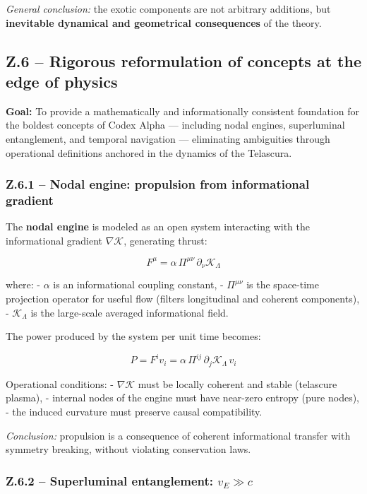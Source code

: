 \documentclass[12pt]{article}
\begin{document}
\textit{General conclusion:} the exotic components are not arbitrary additions, but \textbf{inevitable dynamical and geometrical consequences} of the theory.

\subsection*{Z.6 – Rigorous reformulation of concepts at the edge of physics}

\textbf{Goal:} To provide a mathematically and informationally consistent foundation for the boldest concepts of Codex Alpha — including nodal engines, superluminal entanglement, and temporal navigation — eliminating ambiguities through operational definitions anchored in the dynamics of the Telascura.

\subsubsection*{Z.6.1 – Nodal engine: propulsion from informational gradient}

The \textbf{nodal engine} is modeled as an open system interacting with the informational gradient $\nabla \mathcal{K}$, generating thrust:

\[
F^\mu = \alpha \, \Pi^{\mu\nu} \, \partial_\nu \mathcal{K}_\Lambda
\]

where:
- $\alpha$ is an informational coupling constant,
- $\Pi^{\mu\nu}$ is the space-time projection operator for useful flow (filters longitudinal and coherent components),
- $\mathcal{K}_\Lambda$ is the large-scale averaged informational field.

The power produced by the system per unit time becomes:

\[
P = F^i v_i = \alpha \, \Pi^{ij} \, \partial_j \mathcal{K}_\Lambda \, v_i
\]

Operational conditions:
- $\nabla \mathcal{K}$ must be locally coherent and stable (telascure plasma),
- internal nodes of the engine must have near-zero entropy (pure nodes),
- the induced curvature must preserve causal compatibility.

\textit{Conclusion:} propulsion is a consequence of coherent informational transfer with symmetry breaking, without violating conservation laws.

\subsubsection*{Z.6.2 – Superluminal entanglement: $v_E \gg c$}
\end{document}
